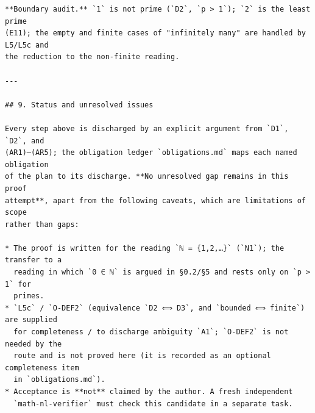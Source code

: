 \documentclass[11pt]{article}
\begin{document}
\begin{verbatim}
**Boundary audit.** `1` is not prime (`D2`, `p > 1`); `2` is the least prime
(E11); the empty and finite cases of "infinitely many" are handled by L5/L5c and
the reduction to the non-finite reading.

---

## 9. Status and unresolved issues

Every step above is discharged by an explicit argument from `D1`, `D2`, and
(AR1)–(AR5); the obligation ledger `obligations.md` maps each named obligation
of the plan to its discharge. **No unresolved gap remains in this proof
attempt**, apart from the following caveats, which are limitations of scope
rather than gaps:

* The proof is written for the reading `ℕ = {1,2,…}` (`N1`); the transfer to a
  reading in which `0 ∈ ℕ` is argued in §0.2/§5 and rests only on `p > 1` for
  primes.
* `L5c` / `O-DEF2` (equivalence `D2 ⟺ D3`, and `bounded ⟺ finite`) are supplied
  for completeness / to discharge ambiguity `A1`; `O-DEF2` is not needed by the
  route and is not proved here (it is recorded as an optional completeness item
  in `obligations.md`).
* Acceptance is **not** claimed by the author. A fresh independent
  `math-nl-verifier` must check this candidate in a separate task.

\end{verbatim}
\end{document}
